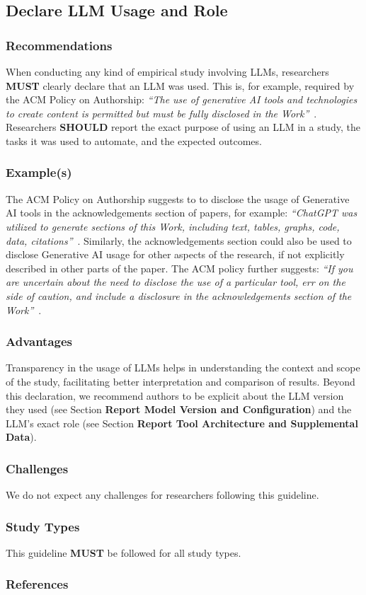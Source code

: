 \documentclass[11pt]{article}
\newcommand{\must}{\textbf{MUST}\xspace}
\newcommand{\should}{\textbf{SHOULD}\xspace}
\begin{document}
\subsection{Declare LLM Usage and Role}

\subsubsection{Recommendations}

When conducting any kind of empirical study involving LLMs, researchers \must clearly declare that an LLM was used.
This is, for example, required by the ACM Policy on Authorship: \emph{``The use of generative AI tools and technologies to create content is permitted but must be fully disclosed in the Work''}~\cite{ACM2023}.
Researchers \should report the exact purpose of using an LLM in a study, the tasks it was used to automate, and the expected outcomes.


\subsubsection{Example(s)}

The ACM Policy on Authorship suggests to to disclose the usage of Generative AI tools in the acknowledgements section of papers, for example: \emph{``ChatGPT was utilized to generate sections of this Work, including text, tables, graphs, code, data, citations''}~\cite{ACM2023}. 
Similarly, the acknowledgements section could also be used to disclose Generative AI usage for other aspects of the research, if not explicitly described in other parts of the paper.
The ACM policy further suggests: \emph{``If you are uncertain ­about the need to disclose the use of a particular tool, err on the side of caution, and include a disclosure in the acknowledgements section of the Work''}~\cite{ACM2023}.


\subsubsection{Advantages}

Transparency in the usage of LLMs helps in understanding the context and scope of the study, facilitating better interpretation and comparison of results.
Beyond this declaration, we recommend authors to be explicit about the LLM version they used (see Section \textbf{Report Model Version and Configuration}) and the LLM's exact role (see Section \textbf{Report Tool Architecture and Supplemental Data}).


\subsubsection{Challenges}

We do not expect any challenges for researchers following this guideline.


\subsubsection{Study Types}

This guideline \must be followed for all study types.


\subsubsection{References}



\end{document}
